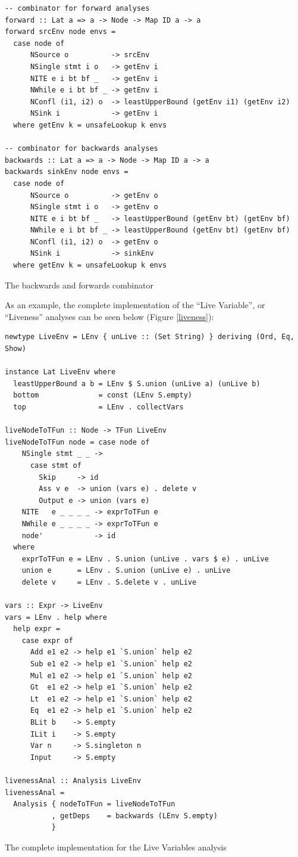 \documentclass{article}
\begin{document}
\begin{listing}[H]
\begin{verbatim}
-- combinator for forward analyses
forward :: Lat a => a -> Node -> Map ID a -> a
forward srcEnv node envs =
  case node of
      NSource o          -> srcEnv
      NSingle stmt i o   -> getEnv i
      NITE e i bt bf _   -> getEnv i
      NWhile e i bt bf _ -> getEnv i
      NConfl (i1, i2) o  -> leastUpperBound (getEnv i1) (getEnv i2)
      NSink i            -> getEnv i
  where getEnv k = unsafeLookup k envs

-- combinator for backwards analyses
backwards :: Lat a => a -> Node -> Map ID a -> a
backwards sinkEnv node envs =
  case node of
      NSource o          -> getEnv o
      NSingle stmt i o   -> getEnv o
      NITE e i bt bf _   -> leastUpperBound (getEnv bt) (getEnv bf)
      NWhile e i bt bf _ -> leastUpperBound (getEnv bt) (getEnv bf)
      NConfl (i1, i2) o  -> getEnv o
      NSink i            -> sinkEnv
  where getEnv k = unsafeLookup k envs
\end{verbatim}
\caption{The backwards and forwards combinator}
\label{back-forwd}
\end{listing}

As an example, the complete implementation of the ``Live Variable'', or
``Liveness'' analyses can be seen below (Figure \ref{liveness}):

\begin{listing}[H]
\begin{verbatim}
newtype LiveEnv = LEnv { unLive :: (Set String) } deriving (Ord, Eq, Show)

instance Lat LiveEnv where
  leastUpperBound a b = LEnv $ S.union (unLive a) (unLive b)
  bottom              = const (LEnv S.empty)
  top                 = LEnv . collectVars

liveNodeToTFun :: Node -> TFun LiveEnv
liveNodeToTFun node = case node of
    NSingle stmt _ _ ->
      case stmt of
        Skip     -> id
        Ass v e  -> union (vars e) . delete v
        Output e -> union (vars e)
    NITE   e _ _ _ _ -> exprToTFun e
    NWhile e _ _ _ _ -> exprToTFun e
    node'            -> id
  where
    exprToTFun e = LEnv . S.union (unLive . vars $ e) . unLive
    union e      = LEnv . S.union (unLive e) . unLive
    delete v     = LEnv . S.delete v . unLive

vars :: Expr -> LiveEnv
vars = LEnv . help where
  help expr =
    case expr of
      Add e1 e2 -> help e1 `S.union` help e2
      Sub e1 e2 -> help e1 `S.union` help e2
      Mul e1 e2 -> help e1 `S.union` help e2
      Gt  e1 e2 -> help e1 `S.union` help e2
      Lt  e1 e2 -> help e1 `S.union` help e2
      Eq  e1 e2 -> help e1 `S.union` help e2
      BLit b    -> S.empty
      ILit i    -> S.empty
      Var n     -> S.singleton n
      Input     -> S.empty

livenessAnal :: Analysis LiveEnv
livenessAnal =
  Analysis { nodeToTFun = liveNodeToTFun
           , getDeps    = backwards (LEnv S.empty)
           }
\end{verbatim}
\caption{The complete implementation for the Live Variables analysis}
\label{liveness}
\end{listing}
\end{document}
